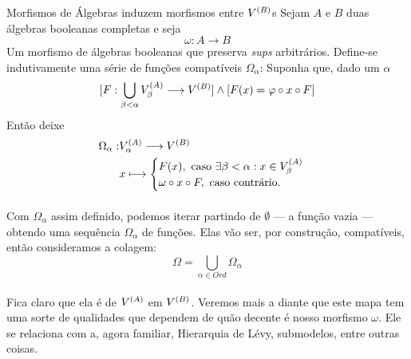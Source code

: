     \begin{proposition}{Morfismos de Álgebras induzem morfismos entre $V^{(B)}$s}
        Sejam $A$ e $B$ duas álgebras booleanas completas e seja 
        $$\omega: A\longrightarrow B$$
        Um morfismo de álgebras booleanas que preserva \textit{sups} arbitrários.
        Define-se indutivamente uma série de funções compatíveis $\Omega_\alpha$:
        Suponha que, dado um $\alpha$
        $$[F:\bigcup_{\beta<\alpha}V^{(A)}_\beta\longrightarrow V^{(B)}] \land [F(x) = \varphi\circ x\circ F]$$
        Então deixe 
        \begin{align*}
            \Omega_\alpha : &V^{(A)}_\alpha \longrightarrow V^{(B)}\\
                            & x           \longmapsto \begin{cases}
                F(x),                 \text{ caso } \exists\beta<\alpha:x\in V^{(A)}_\beta\\
                \omega\circ x\circ F, \text{ caso contrário.}
            \end{cases}
        \end{align*}
        \paragraph{}
            Com $\Omega_\alpha$ assim definido, podemos iterar partindo de $\emptyset$ 
            --- a função vazia --- obtendo uma sequência $\Omega_\alpha$ de funções.
            Elas vão ser, por construção, compatíveis, então consideramos a colagem:
            $$\Omega = \bigcup_{\alpha\in Ord}\Omega_\alpha$$
        \paragraph{}
            Fica claro que ela é de $V^{(A)}$ em $V^{(B)}$. Veremos mais a diante que 
            este mapa tem uma sorte de qualidades que dependem de quão decente é 
            nosso morfismo $\omega$. Ele se relaciona com a, agora familiar, 
            Hierarquia de Lévy, submodelos, entre outras coisas.
    \end{proposition}